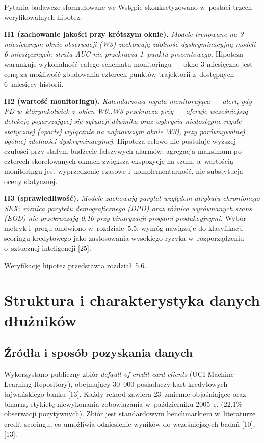 Pytania badawcze sformułowane we Wstępie skonkretyzowano w~postaci trzech
weryfikowalnych hipotez:

\textbf{H1 (zachowanie jakości przy krótszym oknie).} \emph{Modele trenowane na
3-miesięcznym oknie obserwacji (W3) zachowują zdolność dyskryminacyjną modeli
6-miesięcznych: strata AUC nie przekracza 1~punktu procentowego.} Hipoteza
warunkuje wykonalność całego schematu monitoringu --- okno 3-miesięczne jest ceną
za możliwość zbudowania czterech punktów trajektorii z~dostępnych 6~miesięcy
historii.

\textbf{H2 (wartość monitoringu).} \emph{Kalendarzowa reguła monitorująca ---
alert, gdy PD w~którymkolwiek z~okien W0..W3 przekracza próg --- oferuje
wcześniejszą detekcję pogarszającej się sytuacji dłużnika oraz wykrycia
niedostępne regule statycznej (opartej wyłącznie na najnowszym oknie W3), przy
porównywalnej ogólnej zdolności dyskryminacyjnej.} Hipoteza celowo nie postuluje
wyższej czułości przy stałym budżecie fałszywych alarmów: agregacja maksimum po
czterech skorelowanych oknach zwiększa ekspozycję na szum, a~wartością
monitoringu jest wyprzedzenie czasowe i~komplementarność, nie substytucja oceny
statycznej.

\textbf{H3 (sprawiedliwość).} \emph{Modele zachowują parytet względem atrybutu
chronionego SEX: różnica parytetu demograficznego (DPD) oraz różnica wyrównanych
szans (EOD) nie przekraczają 0,10 przy binaryzacji progami produkcyjnymi.}
Wybór metryk i~progu omówiono w~rozdziale~5.5; wymóg nawiązuje do klasyfikacji
scoringu kredytowego jako zastosowania wysokiego ryzyka w~rozporządzeniu
o~sztucznej inteligencji [25].

Weryfikację hipotez przedstawia rozdział~5.6.

\section{Struktura i charakterystyka danych dłużników}

\subsection{Źródła i sposób pozyskania danych}

Wykorzystano publiczny zbiór \emph{default of credit card clients} (UCI Machine
Learning Repository), obejmujący 30~000 posiadaczy kart kredytowych tajwańskiego
banku [13]. Każdy rekord zawiera 23~zmienne objaśniające oraz binarną etykietę
niewykonania zobowiązania w~październiku 2005~r. (22,1\% obserwacji pozytywnych).
Zbiór jest standardowym benchmarkiem w~literaturze credit scoringu, co umożliwia
odniesienie wyników do wcześniejszych badań [10], [13].

